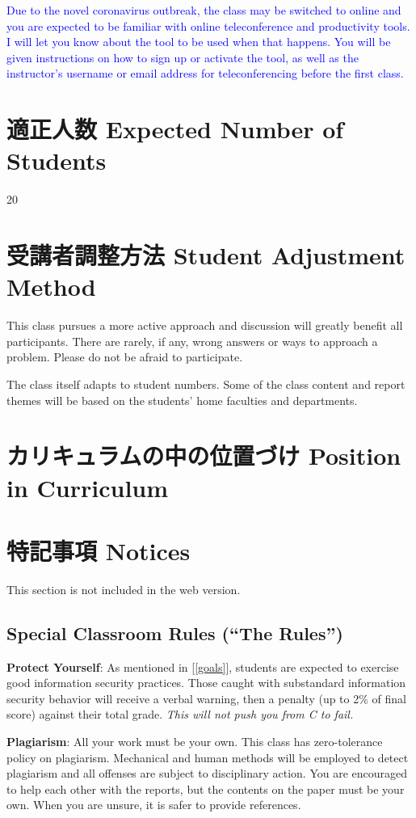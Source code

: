 \documentclass[a4paper]{article}
\begin{document}
\textcolor{blue}{Due to the novel coronavirus outbreak, the class may be switched to online and you are expected to be familiar with online teleconference and productivity tools. I will let you know about the tool to be used when that happens. You will be given instructions on how to sign up or activate the tool, as well as the instructor's username or email address for teleconferencing before the first class.}

\section{適正人数 Expected Number of Students}
20

\section{受講者調整方法 Student Adjustment Method}
This class pursues a more active approach and discussion will greatly benefit all participants. There are rarely, if any, wrong answers or ways to approach a problem. Please do not be afraid to participate.

The class itself adapts to student numbers. Some of the class content and report themes will be based on the students' home faculties and departments.

\section{カリキュラムの中の位置づけ Position in Curriculum}
\section{特記事項 Notices}
This section is not included in the web version.

\subsection{Special Classroom Rules (``The Rules'')}

\textbf{Protect Yourself}: As mentioned in [\ref{goals}], students are expected to exercise good information security practices. Those caught with substandard information security behavior will receive a verbal warning, then a penalty (up to 2\% of final score) against their total grade. \textit{This will not push you from C to fail.}

\smallskip\noindent
\textbf{Plagiarism}: All your work must be your own. This class has zero-tolerance policy on plagiarism. Mechanical and human methods will be employed to detect plagiarism and all offenses are subject to disciplinary action. You are encouraged to help each other with the reports, but the contents on the paper must be your own. When you are unsure, it is safer to provide references.
\end{document}
